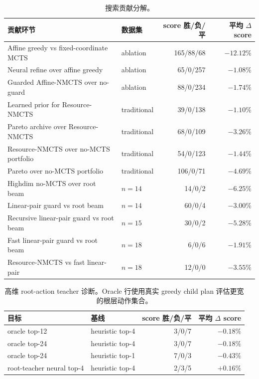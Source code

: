 \documentclass[UTF8,fontset=macnew,11pt]{ctexart}
\newcommand{\method}{Resource-NMCTS}
\begin{document}
\begin{table}[t]
\centering
\small
\caption{搜索贡献分解。}
\label{tab:contribution-zh}
\begin{tabularx}{\linewidth}{>{\raggedright\arraybackslash}Xlrr}
\toprule
贡献环节 & 数据集 & score 胜/负/平 & 平均 $\Delta$ score \\
\midrule
Affine greedy vs fixed-coordinate MCTS & ablation & 165/88/68 & $-12.12\%$ \\
Neural refine over affine greedy & ablation & 65/0/257 & $-1.08\%$ \\
Guarded Affine-NMCTS over no-guard & ablation & 88/0/234 & $-1.74\%$ \\
Learned prior for \method{} & traditional & 39/0/138 & $-1.10\%$ \\
Pareto archive over \method{} & traditional & 68/0/109 & $-3.26\%$ \\
\method{} over no-MCTS portfolio & traditional & 54/0/123 & $-1.44\%$ \\
Pareto over no-MCTS portfolio & traditional & 106/0/71 & $-4.69\%$ \\
Highdim no-MCTS over root beam & $n=14$ & 14/0/2 & $-6.25\%$ \\
Linear-pair guard vs root beam & $n=14$ & 60/0/4 & $-3.00\%$ \\
Recursive linear-pair guard vs root beam & $n=15$ & 30/0/2 & $-5.28\%$ \\
Fast linear-pair guard vs root beam & $n=18$ & 6/0/6 & $-1.91\%$ \\
\method{} vs fast linear-pair & $n=18$ & 12/0/0 & $-3.55\%$ \\
\bottomrule
\end{tabularx}
\end{table}

\begin{table}[t]
\centering
\small
\caption{高维 root-action teacher 诊断。Oracle 行使用真实 greedy child plan 评估更宽的根层动作集合。}
\label{tab:root-action-zh}
\begin{tabular}{llrr}
\toprule
目标 & 基线 & score 胜/负/平 & 平均 $\Delta$ score \\
\midrule
oracle top-12 & heuristic top-4 & 3/0/7 & $-0.18\%$ \\
oracle top-24 & heuristic top-4 & 3/0/7 & $-0.18\%$ \\
oracle top-24 & heuristic top-1 & 7/0/3 & $-0.43\%$ \\
root-teacher neural top-4 & heuristic top-4 & 2/3/5 & $+0.16\%$ \\
\bottomrule
\end{tabular}
\end{table}
\end{document}
